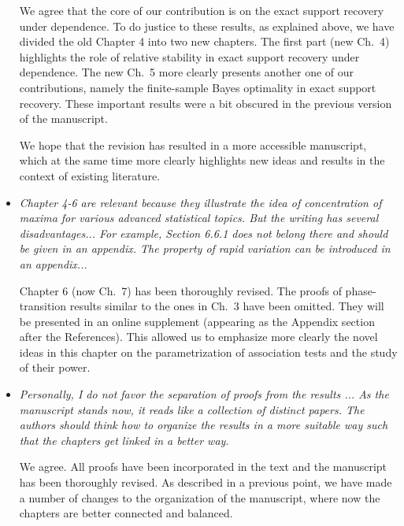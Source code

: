 \documentclass[11pt]{article}
\begin{document}
\begin{itemize}
     
     We agree that the core of our contribution is on the exact support recovery under dependence.  To do justice to these results, as explained above, 
     we have divided the old Chapter 4 into two new chapters.  The first part (new Ch.\ 4) highlights the role of relative stability in exact support recovery 
     under dependence. The new Ch.\ 5 more clearly presents another one of our contributions, namely the finite-sample Bayes optimality in 
     exact support recovery.  These important results were a bit obscured in the previous version of the manuscript.  
     
     We hope that the revision has resulted in a more accessible manuscript, which at the same time more clearly highlights new ideas and results in the
     context of existing literature.
     
     \item {\em Chapter 4-6 are relevant because they illustrate the idea of concentration of maxima for various advanced statistical topics. But the writing has several disadvantages... For example, Section 6.6.1 does not belong there and should be given in an appendix. The property of rapid variation can be introduced in an appendix...}
     
     Chapter 6 (now Ch.\ 7) has been thoroughly revised. 
     The proofs of phase-transition results similar to the ones in Ch.\ 3 have been omitted.  They
     will be presented in an online supplement (appearing as the Appendix section after the References).  This 
     allowed us to emphasize more clearly the novel ideas in this chapter on the parametrization of association tests and the study of their power.  
     
         
     \item {\em Personally, I do not favor the separation of proofs from the results ... As the manuscript stands now, it reads like a collection of distinct papers. 
     The authors should think how to organize the results in a more suitable way such that the chapters get linked in a better way.}
     
     We agree.  All proofs have been incorporated in the text and the manuscript has been thoroughly revised.  As described in a previous point, we have
     made a number of changes to the organization of the manuscript, where now the chapters are better connected and balanced.
     
     
   \end{itemize}
   
\end{document}
